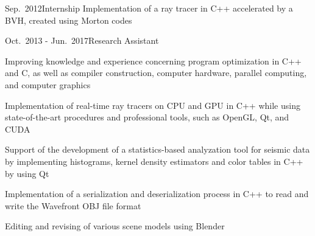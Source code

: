 \documentclass[a4paper,10pt]{cv}
\begin{document}
      \begin{cvTimeItem}{Sep.~2012}{Internship}
        Implementation of a ray tracer in C++ accelerated by a BVH, created using Morton codes
      \end{cvTimeItem}
      \begin{cvTimeItem}{Oct.~2013 - Jun.~2017}{Research Assistant}
        \begin{cvItemize}
          \item Improving knowledge and experience concerning program optimization in C++ and C, as well as compiler construction, computer hardware, parallel computing, and computer graphics
          \item Implementation of real-time ray tracers on CPU and GPU in C++ while using state-of-the-art procedures and professional tools, such as OpenGL, Qt, and CUDA
          \item Support of the development of a statistics-based analyzation tool for seismic data by implementing histograms, kernel density estimators and color tables in C++ by using Qt
          \item Implementation of a serialization and deserialization process in C++ to read and write the Wavefront OBJ file format
          \item Editing and revising of various scene models using Blender
        \end{cvItemize}
      \end{cvTimeItem}
\end{document}
